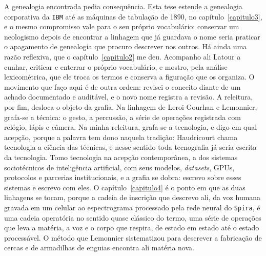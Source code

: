 A genealogia encontrada pedia consequência. Esta tese estende a genealogia corporativa da \texttt{IBM} até as máquinas de tabulação de 1890, no capítulo~\ref{capitulo3}, e o mesmo compromisso vale para o seu próprio vocabulário: conservar um neologismo depois de encontrar a linhagem que já guardava o nome seria praticar o apagamento de genealogia que procuro descrever nos outros. Há ainda uma razão reflexiva, que o capítulo~\ref{capitulo2} me deu. Acompanho ali Latour a cunhar, criticar e enterrar o próprio vocabulário, e mostro, pela análise lexicométrica, que ele troca os termos e conserva a figuração que os organiza. O movimento que faço aqui é de outra ordem: revisei o conceito diante de um achado documentado e auditável, e o novo nome registra a revisão. A releitura, por fim, desloca o objeto da grafia. Na linhagem de Leroi-Gourhan e Lemonnier, grafa-se a técnica: o gesto, a percussão, a série de operações registrada com relógio, lápis e câmera. Na minha releitura, grafa-se a tecnologia, e digo em qual acepção, porque a palavra tem dono naquela tradição: Haudricourt chama tecnologia a ciência das técnicas, e nesse sentido toda tecnografia já seria escrita da tecnologia. Tomo tecnologia na acepção contemporânea, a dos sistemas sociotécnicos de inteligência artificial, com seus modelos, \emph{datasets}, GPUs, protocolos e parcerias institucionais, e a grafia se dobra: escrevo sobre esses sistemas e escrevo com eles. O capítulo~\ref{capitulo4} é o ponto em que as duas linhagens se tocam, porque a cadeia de inscrição que descrevo ali, da voz humana gravada em um celular ao espectrograma processado pela rede neural do \texttt{Spira}, é uma cadeia operatória no sentido quase clássico do termo, uma série de operações que leva a matéria, a voz e o corpo que respira, de estado em estado até o estado processável. O método que Lemonnier sistematizou para descrever a fabricação de cercas e de armadilhas de enguias encontra ali matéria nova.

